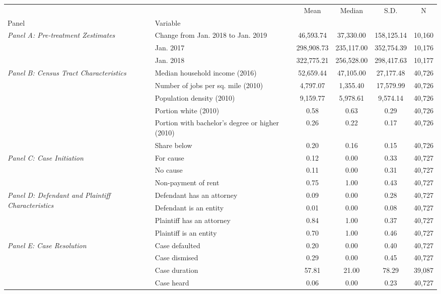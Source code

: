 \begin{tabular}{llcccc}
\toprule
 &  & Mean & Median & S.D. & N \\
Panel & Variable &  &  &  &  \\
\midrule
\multirow[c]{3}{3cm}{\textit{Panel A: Pre-treatment Zestimates}} & Change from Jan. 2018 to Jan. 2019 & 46,593.74 & 37,330.00 & 158,125.14 & 10,160 \\
 & Jan. 2017 & 298,908.73 & 235,117.00 & 352,754.39 & 10,176 \\
 & Jan. 2018 & 322,775.21 & 256,528.00 & 298,417.63 & 10,177 \\
\cline{1-6}
\multirow[c]{6}{3cm}{\textit{Panel B: Census Tract Characteristics}} & Median household income (2016) & 52,659.44 & 47,105.00 & 27,177.48 & 40,726 \\
 & Number of jobs per sq. mile (2010) & 4,797.07 & 1,355.40 & 17,579.99 & 40,726 \\
 & Population density (2010) & 9,159.77 & 5,978.61 & 9,574.14 & 40,726 \\
 & Portion white (2010) & 0.58 & 0.63 & 0.29 & 40,726 \\
 & Portion with bachelor's degree or higher (2010) & 0.26 & 0.22 & 0.17 & 40,726 \\
 & Share below  & 0.20 & 0.16 & 0.15 & 40,726 \\
\cline{1-6}
\multirow[c]{3}{3cm}{\textit{Panel C: Case Initiation}} & For cause & 0.12 & 0.00 & 0.33 & 40,727 \\
 & No cause & 0.11 & 0.00 & 0.31 & 40,727 \\
 & Non-payment of rent & 0.75 & 1.00 & 0.43 & 40,727 \\
\cline{1-6}
\multirow[c]{4}{3cm}{\textit{Panel D: Defendant and Plaintiff Characteristics}} & Defendant has an attorney & 0.09 & 0.00 & 0.28 & 40,727 \\
 & Defendant is an entity & 0.01 & 0.00 & 0.08 & 40,727 \\
 & Plaintiff has an attorney & 0.84 & 1.00 & 0.37 & 40,727 \\
 & Plaintiff is an entity & 0.70 & 1.00 & 0.46 & 40,727 \\
\cline{1-6}
\multirow[c]{6}{3cm}{\textit{Panel E: Case Resolution}} & Case defaulted & 0.20 & 0.00 & 0.40 & 40,727 \\
 & Case dismised & 0.29 & 0.00 & 0.45 & 40,727 \\
 & Case duration & 57.81 & 21.00 & 78.29 & 39,087 \\
 & Case heard & 0.06 & 0.00 & 0.23 & 40,727 \\

\end{tabular}
